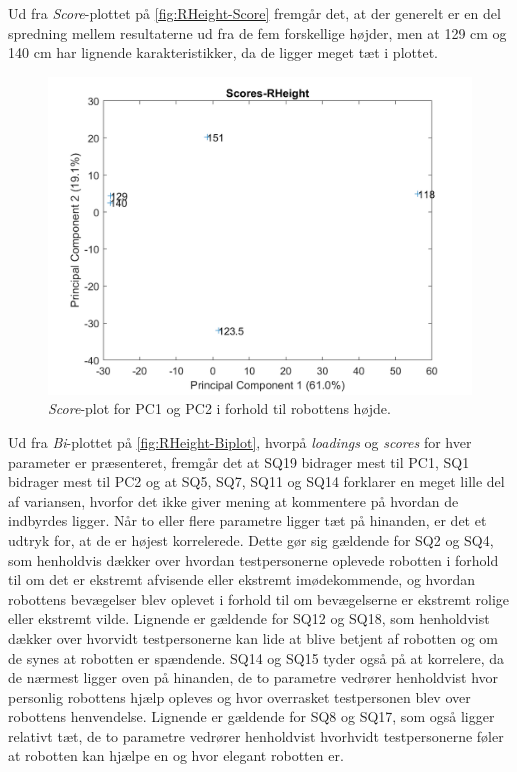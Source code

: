 \noindent
%
Ud fra \textit{Score}-plottet på \autoref{fig:RHeight-Score} fremgår det, at der generelt er en del spredning mellem resultaterne ud fra de fem forskellige højder, men at 129 cm og 140 cm har lignende karakteristikker, da de ligger meget tæt i plottet.
%
\begin{figure}[H]
\centering
\includegraphics[width=\textwidth]{Figure/DatabehandlingSkalaer/PCAfigures/RHeight-Scores}
\caption{\textit{Score}-plot for PC1 og PC2 i forhold til robottens højde.}
\label{fig:RHeight-Score}
\end{figure}
\noindent
%
Ud fra \textit{Bi}-plottet på \autoref{fig:RHeight-Biplot}, hvorpå \textit{loadings} og \textit{scores} for hver parameter er præsenteret, fremgår det at SQ19 bidrager mest til PC1, SQ1 bidrager mest til PC2 og at SQ5, SQ7, SQ11 og SQ14 forklarer en meget lille del af variansen, hvorfor det ikke giver mening at kommentere på hvordan de indbyrdes ligger. Når to eller flere parametre ligger tæt på hinanden, er det et udtryk for, at de er højest korrelerede. Dette gør sig gældende for SQ2 og SQ4, som henholdvis dækker over hvordan testpersonerne oplevede robotten i forhold til om det er ekstremt afvisende eller ekstremt imødekommende, og hvordan robottens bevægelser blev oplevet i forhold til om bevægelserne er ekstremt rolige eller ekstremt vilde. Lignende er gældende for SQ12 og SQ18, som henholdvist dækker over hvorvidt testpersonerne kan lide at blive betjent af robotten og om de synes at robotten er spændende. SQ14 og SQ15 tyder også på at korrelere, da de nærmest ligger oven på hinanden, de to parametre vedrører henholdvist hvor personlig robottens hjælp opleves og hvor overrasket testpersonen blev over robottens henvendelse. Lignende er gældende for SQ8 og SQ17, som også ligger relativt tæt, de to parametre vedrører henholdvist hvorhvidt testpersonerne føler at robotten kan hjælpe en og hvor elegant robotten er. 


